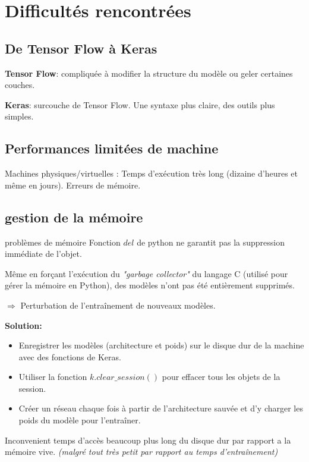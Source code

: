 \documentclass{beamer}
\begin{document}
\section{Difficultés rencontrées}
    \subsection{De Tensor Flow à Keras}
	\begin{frame}
    \textbf{Tensor Flow}: compliquée à modifier la structure du modèle ou geler certaines couches.
    
    \textbf{Keras}: surcouche de Tensor Flow. Une syntaxe plus claire, des outils plus simples.
	\end{frame}
    
    \subsection{Performances limitées de machine}
	\begin{frame}
    Machines physiques/virtuelles : Temps d'exécution très long (dizaine d'heures et même en jours). Erreurs de mémoire.
	\end{frame}
    
    \subsection{gestion de la mémoire}
	\begin{frame}
    \begin{block}{probl\`emes de mémoire}
     Fonction $del$ de python ne garantit pas la suppression immédiate de l’objet.
    \end{block}
    
    Même en forçant l’exécution du \emph{"garbage collector"} du langage C (utilisé pour gérer la mémoire en Python), des modèles n'ont pas été entièrement supprimés.
    \newline
    
    $\Longrightarrow$ Perturbation de l’entraînement de nouveaux modèles.
    \end{frame}
    
	\begin{frame}
    \textbf{Solution:}
    
    \begin{itemize}
    
    \item Enregistrer les modèles (architecture et poids) sur le disque dur de la machine avec des fonctions de Keras.
    \item Utiliser la fonction $k.clear\_session()$ pour effacer tous les objets de la session.
    \item Créer un réseau chaque fois à partir de l’architecture sauvée et d’y charger les poids du modèle pour l'entraîner. 
    \end{itemize}
    \begin{block}{Inconvenient}
    temps d’accès beaucoup plus long du disque dur par rapport a la mémoire vive. \emph{(malgré tout très petit par rapport au temps d’entraînement)}
    \end{block}
    \end{frame}
    
\end{document}
